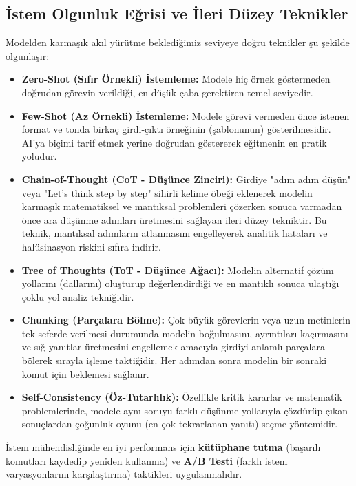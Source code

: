 \documentclass[11pt,a4paper,openany]{book}
\begin{document}
\needspace{9cm}
\subsection{İstem Olgunluk Eğrisi ve İleri Düzey Teknikler}
Modelden karmaşık akıl yürütme beklediğimiz seviyeye doğru teknikler şu şekilde olgunlaşır:
\begin{itemize}
    \item \textbf{Zero-Shot (Sıfır Örnekli) İstemleme:} Modele hiç örnek göstermeden doğrudan görevin verildiği, en düşük çaba gerektiren temel seviyedir.
    \item \textbf{Few-Shot (Az Örnekli) İstemleme:} Modele görevi vermeden önce istenen format ve tonda birkaç girdi-çıktı örneğinin (şablonunun) gösterilmesidir. AI'ya biçimi tarif etmek yerine doğrudan göstererek eğitmenin en pratik yoludur.
    \item \textbf{Chain-of-Thought (CoT - Düşünce Zinciri):} Girdiye "adım adım düşün" veya "Let's think step by step" sihirli kelime öbeği eklenerek modelin karmaşık matematiksel ve mantıksal problemleri çözerken sonuca varmadan önce ara düşünme adımları üretmesini sağlayan ileri düzey tekniktir. Bu teknik, mantıksal adımların atlanmasını engelleyerek analitik hataları ve halüsinasyon riskini sıfıra indirir.
    \item \textbf{Tree of Thoughts (ToT - Düşünce Ağacı):} Modelin alternatif çözüm yollarını (dallarını) oluşturup değerlendirdiği ve en mantıklı sonuca ulaştığı çoklu yol analiz tekniğidir.
    \item \textbf{Chunking (Parçalara Bölme):} Çok büyük görevlerin veya uzun metinlerin tek seferde verilmesi durumunda modelin boğulmasını, ayrıntıları kaçırmasını ve sığ yanıtlar üretmesini engellemek amacıyla girdiyi anlamlı parçalara bölerek sırayla işleme taktiğidir. Her adımdan sonra modelin bir sonraki komut için beklemesi sağlanır.
    \item \textbf{Self-Consistency (Öz-Tutarlılık):} Özellikle kritik kararlar ve matematik problemlerinde, modele aynı soruyu farklı düşünme yollarıyla çözdürüp çıkan sonuçlardan çoğunluk oyunu (en çok tekrarlanan yanıtı) seçme yöntemidir.
\end{itemize}
İstem mühendisliğinde en iyi performans için \textbf{kütüphane tutma} (başarılı komutları kaydedip yeniden kullanma) ve \textbf{A/B Testi} (farklı istem varyasyonlarını karşılaştırma) taktikleri uygulanmalıdır.

\needspace{9cm}
\end{document}
